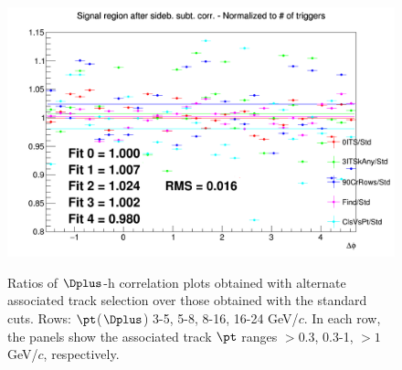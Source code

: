 \begin{figure}
{\includegraphics[width=0.31\linewidth]{Centrality_DPlus/Dplus/Systematic/20_60/Tracks_20_60/Ratio_AzimCorrDistr_Dplus_Canvas_PtIntBins11to11_PoolInt_thr1dotto99dot.png}} \\
 \caption{Ratios of $\Dplus$-h correlation plots obtained with alternate associated track selection over those obtained with the standard cuts. Rows: $\pt$($\Dplus$) 3-5, 5-8, 8-16, 16-24 GeV/$c$. In each row, the panels show the associated track
$\pt$ ranges $> 0.3$, 0.3-1, $> 1$ GeV/$c$, respectively.}
\label{fig:SysTrEff2060_Dplus}
\end{figure}

